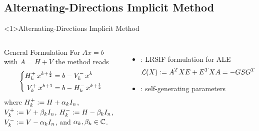 \subsection{Alternating-Directions Implicit Method}

\begin{frame}<1>{Alternating-Directions Implicit Method}
\begin{columns}
  \begin{block}{General Formulation \parencite{Peaceman1955}}
    For $Ax=b$ with $A = H+V$ the method reads
    \begin{equation*}
    \left\{
    \begin{aligned}
      \mathop{H_k^+}  x^{k+\frac{1}{2}} &= b - \mathop{V_k^-} x^k \\
      \mathop{V_k^+} x^{k+1}           &= b - \mathop{H_k^-} x^{k+\frac{1}{2}}
    \end{aligned}
    \right.
    \end{equation*}
    where
    $\mathop{H_k^+}  := H + \alpha_k I_n$,
    $\mathop{V_k^+} := V + \beta_k  I_n$,
    $\mathop{H_k^-}  := H - \beta_k  I_n$,
    $\mathop{V_k^-} := V - \alpha_k I_n$,
    and $\alpha_k, \beta_k\in\mathbb{C}$.
  \end{block}
  \begin{itemize}
    \item
      \cite{Lang2017}: LRSIF formulation for ALE
      \begin{equation*}
        \operatorname{\mathcal L}(X) := A^T X E + E^T X A = -GSG^T
      \end{equation*}
    \item
      \cite{Kuerschner2016}: self-generating parameters
  \end{itemize}
\end{columns}
\end{frame}
